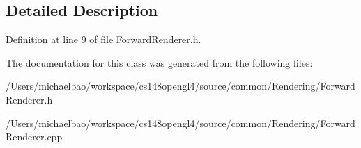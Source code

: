 \subsection{Detailed Description}


Definition at line 9 of file Forward\+Renderer.\+h.



The documentation for this class was generated from the following files\+:\begin{DoxyCompactItemize}
\item 
/\+Users/michaelbao/workspace/cs148opengl4/source/common/\+Rendering/Forward\+Renderer.\+h\item 
/\+Users/michaelbao/workspace/cs148opengl4/source/common/\+Rendering/Forward\+Renderer.\+cpp\end{DoxyCompactItemize}
